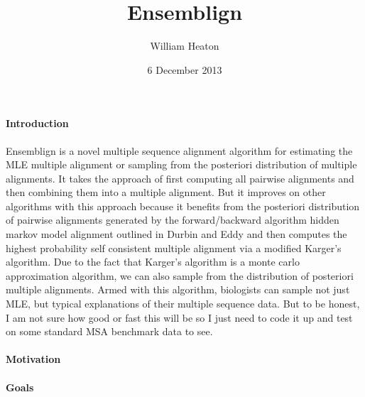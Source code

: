 \documentclass[11pt]{article}
\title{Ensemblign}
\date{6 December 2013} %
\author{William Heaton}
\begin{document}
\maketitle

\paragraph{Introduction\newline}
\par{
Ensemblign is a novel multiple sequence alignment algorithm for estimating the MLE multiple alignment or sampling from the posteriori distribution of multiple alignments. It takes the approach of first computing all pairwise alignments and then combining them into a multiple alignment. But it improves on other algorithms with this approach because it benefits from the posteriori distribution of pairwise alignments generated by the forward/backward algorithm hidden markov model alignment outlined in Durbin and Eddy\cite{Durbin} and then computes the highest probability self consistent multiple alignment via a modified Karger's algorithm. Due to the fact that Karger's algorithm is a monte carlo approximation algorithm, we can also sample from the distribution of posteriori multiple alignments. Armed with this algorithm, biologists can sample not just MLE, but typical explanations of their multiple sequence data. But to be honest, I am not sure how good or fast this will be so I just need to code it up and test on some standard MSA benchmark data to see.

}
 
 
\paragraph{Motivation\newline}





\paragraph{Goals\newline}

\end{document}
